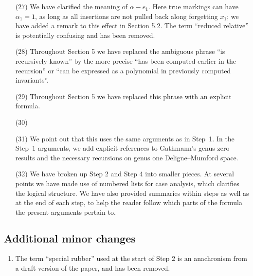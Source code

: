 \documentclass[11pt]{amsart}
\theoremstyle{plain}
\theoremstyle{remark}
\theoremstyle{definition}
\begin{document}
\begin{enumerate}
\item[(27)] We have clarified the meaning of $\alpha-e_1$. Here true markings can have $\alpha_1=1$, as long as all insertions are not pulled back along forgetting $x_1$; we have added a remark to this effect in Section 5.2. The term ``reduced relative'' is potentially confusing and has been removed.
\item[(28)] Throughout Section 5 we have replaced the ambiguous phrase ``is recursively known'' by the more precise ``has been computed earlier in the recursion'' or ``can be expressed as a polynomial in previously computed invariants''.
\item[(29)] Throughout Section 5 we have replaced this phrase with an explicit formula.
\item[(30)]
\item[(31)] We point out that this uses the same arguments as in Step~1. In the Step~1 arguments, we add explicit references to Gathmann's genus zero results and the necessary recursions on genus one Deligne--Mumford space.
\item[(32)] We have broken up Step 2 and Step 4 into smaller pieces. At several points we have made use of numbered lists for case analysis, which clarifies the logical structure. We have also provided summaries within steps as well as at the end of each step, to help the reader follow which parts of the formula the present arguments pertain to.
\end{enumerate}


\subsection*{Additional minor changes}
\begin{enumerate}
\item The term ``special rubber'' used at the start of Step 2 is an anachronism from a draft version of the paper, and has been removed.
\end{enumerate}
\end{document}
